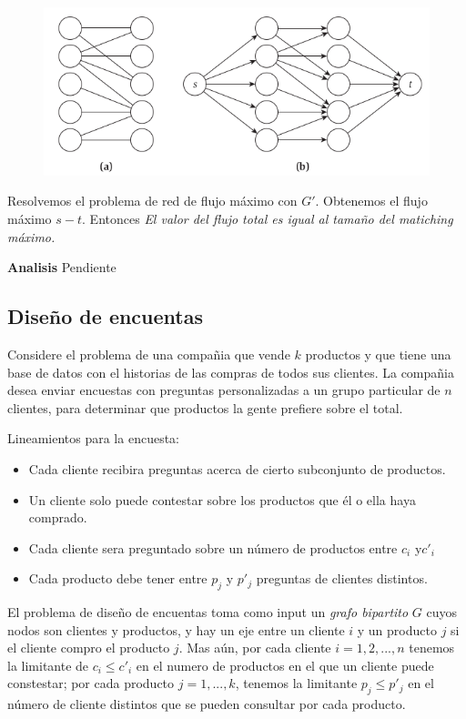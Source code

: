 \documentclass{article}
\begin{document}
\begin{figure}[h!]
    \includegraphics[width=\linewidth]{imagenes/bipartito-redes-flujo.png}
\end{figure}

Resolvemos el problema de red de flujo máximo con \(G'\). Obtenemos el flujo máximo \(s-t\). Entonces
\textit{El valor del flujo total es igual al tamaño del matiching máximo.}

\textbf{Analisis} Pendiente

\newpage
\subsection{Diseño de encuentas}

Considere el problema de una compañia que vende \(k\) productos y que tiene una base de datos con el 
historias de las compras de todos sus clientes. La compañia desea enviar encuestas con preguntas
personalizadas a un grupo particular de \(n\) clientes, para determinar que productos la gente 
prefiere sobre el total.

Lineamientos para la encuesta:
\begin{itemize}
    \item Cada cliente recibira preguntas acerca de cierto subconjunto de productos.
    \item Un cliente solo puede contestar sobre los productos que él o ella haya comprado.
    \item Cada cliente sera preguntado sobre un número de productos entre \(c_i\) y\(c'_i\) 
    \item Cada producto debe tener entre \(p_j\) y \(p'_j\) preguntas de clientes distintos.
\end{itemize}

El problema de diseño de encuentas toma como input un \textit{grafo bipartito} \(G\) cuyos nodos son 
clientes y productos, y hay un eje entre un cliente \(i\) y un producto \(j\) si el cliente compro el producto \(j\).
Mas aún, por cada cliente \(i=1,2,...,n\) tenemos la limitante de \(c_i \leq c'_i\) en el numero de productos en el que un 
cliente puede constestar; por cada producto \(j=1,...,k\), tenemos la limitante \(p_j \leq p'_j\) en el 
número de cliente distintos que se pueden consultar por cada producto.
\end{document}
